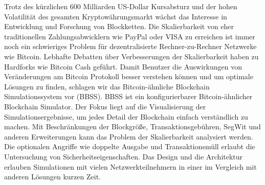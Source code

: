 Trotz des kürzlichen 600 Milliarden US-Dollar Kursabsturz und der hohen Volatilität des gesamten Kryptowährungsmarkt wächst das Interesse in Entwicklung und Forschung von Blockketten. Die Skalierbarkeit von eher traditionellen Zahlungsabwicklern wie PayPal oder VISA zu erreichen ist immer noch ein schwieriges Problem für dezentralisierte Rechner-zu-Rechner Netzwerke wie Bitcoin. Lebhafte Debatten über Verbesserungen der Skalierbarkeit haben zu Hardforks wie Bitcoin Cash geführt. Damit Benutzer die Auswirkungen von Veränderungen am Bitcoin Protokoll besser verstehen können und um optimale Lösungen zu finden, schlagen wir das Bitcoin-ähnliche Blockchain Simulationssystem vor (BBSS). BBSS ist ein konfigurierbarer Bitcoin-ähnlicher Blockchain Simulator. Der Fokus liegt auf die Visualisierung der Simulationsergebnisse, um jedes Detail der Blockchain einfach verständlich zu machen. Mit Beschränkungen der Blockgröße, Transaktionsgebühren, SegWit und anderen Erweiterungen kann das Problem der Skalierbarkeit analysiert werden. Die optionalen Angriffe wie doppelte Ausgabe und Transaktionsmüll erlaubt die Untersuchung von Sicherheitseigenschaften. Das Design und die Architektur erlauben Simulationen mit vielen Netzwerkteilnehmern in einer im Vergleich mit anderen Lösungen kurzen Zeit.